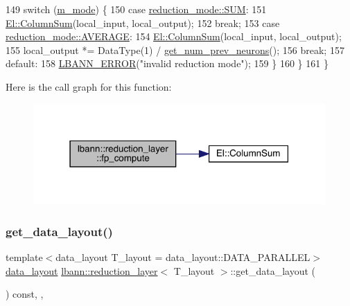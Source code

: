 \begin{DoxyCode}
149       \textcolor{keywordflow}{switch} (\hyperlink{classlbann_1_1reduction__layer_aa8c753154fec05a00ede9217df3ba638}{m\_mode}) \{
150       \textcolor{keywordflow}{case} \hyperlink{namespacelbann_a5975e1fb530a267728bfb01dc5c1be9ba6970bdc2201030b9c03fbdcf3973858a}{reduction\_mode::SUM}:
151         \hyperlink{namespaceEl_a09d5c471681b2b48fbe4c5e6bfd0b3d3}{El::ColumnSum}(local\_input, local\_output);
152         \textcolor{keywordflow}{break};
153       \textcolor{keywordflow}{case} \hyperlink{namespacelbann_a5975e1fb530a267728bfb01dc5c1be9ba16de38737a9f8366e9b2042b4e9b6290}{reduction\_mode::AVERAGE}:
154         \hyperlink{namespaceEl_a09d5c471681b2b48fbe4c5e6bfd0b3d3}{El::ColumnSum}(local\_input, local\_output);
155         local\_output *= DataType(1) / \hyperlink{classlbann_1_1Layer_a27112eb70bbfbd7f3c3e749960400dec}{get\_num\_prev\_neurons}();
156         \textcolor{keywordflow}{break};
157       \textcolor{keywordflow}{default}:
158         \hyperlink{base_8hpp_a80b1d707117e968a6951b7222e4b2b87}{LBANN\_ERROR}(\textcolor{stringliteral}{"invalid reduction mode"});
159       \}
160     \}
161   \}
\end{DoxyCode}
Here is the call graph for this function\+:\nopagebreak
\begin{figure}[H]
\begin{center}
\leavevmode
\includegraphics[width=316pt]{classlbann_1_1reduction__layer_a7e78d0d69106611bfb5ff3fe5bb01016_cgraph}
\end{center}
\end{figure}
\mbox{\label{classlbann_1_1reduction__layer_a9799e2a98d503a64b462674d0cd69b6e}} 
\subsubsection{\texorpdfstring{get\+\_\+data\+\_\+layout()}{get\_data\_layout()}}
{\footnotesize\ttfamily template$<$data\+\_\+layout T\+\_\+layout = data\+\_\+layout\+::\+D\+A\+T\+A\+\_\+\+P\+A\+R\+A\+L\+L\+EL$>$ \\
\hyperlink{base_8hpp_a786677cbfb3f5677b4d84f3056eb08db}{data\+\_\+layout} \hyperlink{classlbann_1_1reduction__layer}{lbann\+::reduction\+\_\+layer}$<$ T\+\_\+layout $>$\+::get\+\_\+data\+\_\+layout (\begin{DoxyParamCaption}{ }\end{DoxyParamCaption}) const\hspace{0.3cm}{\ttfamily [inline]}, {\ttfamily [override]}, {\ttfamily [virtual]}}


